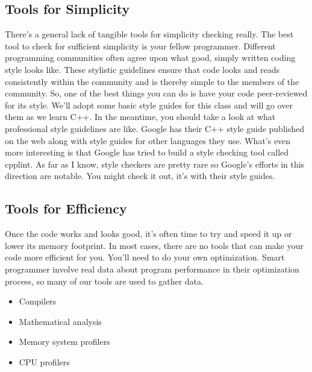 \documentclass[]{tufte-handout}
\begin{document}
\subsection{Tools for Simplicity}

There's a general lack of tangible tools for simplicity checking really. The best tool to check for sufficient simplicity is your fellow programmer.  Different programming communities often agree upon what good, simply written coding style looks like.  These stylistic guidelines ensure that code looks and reads consistently within the community and is thereby simple to the members of the community. So, one of the best things you can do is have your code peer-reviewed for its style. We'll adopt some basic style guides for this class and will go over them as we learn C++. In the meantime, you should take a look at what professional style guidelines are like. Google has their C++ style guide published on the web along with style guides for other languages they use. What's even more interesting is that Google has tried to build a style checking tool called cpplint.  As far as I know, style checkers are pretty rare so Google's efforts in this direction are notable.  You might check it out, it's with their style guides.


\subsection{Tools for Efficiency}

Once the code works and looks good, it's often time to try and speed it up or lower its memory footprint. In most cases, there are no tools that can make your code more efficient for you. You'll need to do your own optimization. Smart programmer involve real data about program performance in their optimization process, so many of our tools are used to gather data.  
\begin{itemize}
\item Compilers
\item Mathematical analysis
\item Memory system profilers
\item CPU profilers
\end{itemize}
\end{document}
